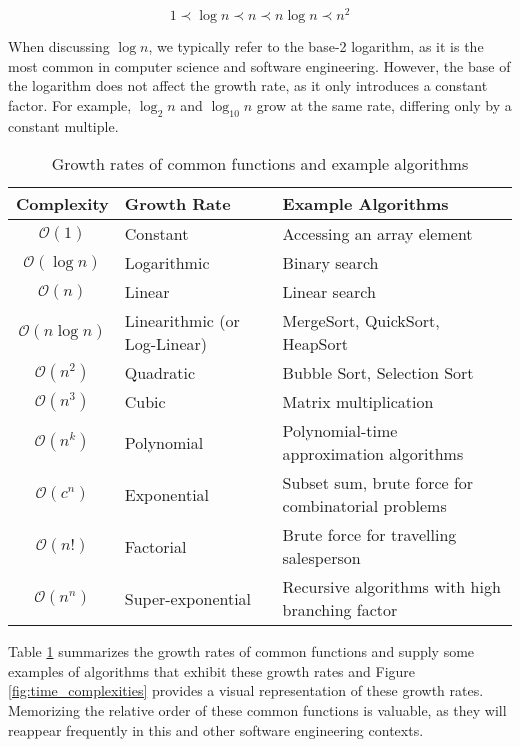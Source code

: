 \[
1 \prec \log n \prec n \prec n \log n \prec n^2
\]

\begin{remark}
    When discussing $\log n$, we typically refer to the base-2 logarithm, as it is the most common in computer science and software engineering. However, the base of the logarithm does not affect the growth rate, as it only introduces a constant factor. For example, $\log_2 n$ and $\log_{10} n$ grow at the same rate, differing only by a constant multiple.
\end{remark}

\begin{table}[htbp]
    \centering
    \renewcommand{\arraystretch}{1.4}
    \begin{tabular}{|c|l|l|}
        \hline
        \textbf{Complexity} & \textbf{Growth Rate} & \textbf{Example Algorithms} \\
        \hline
        \( \mathcal{O}(1) \) & Constant & Accessing an array element \\
        \hline
        \( \mathcal{O}(\log n) \) & Logarithmic & Binary search \\
        \hline
        \( \mathcal{O}(n) \) & Linear & Linear search \\
        \hline
        \( \mathcal{O}(n \log n) \) & Linearithmic (or Log-Linear) & MergeSort, QuickSort, HeapSort \\
        \hline
        \( \mathcal{O}(n^2) \) & Quadratic & Bubble Sort, Selection Sort \\
        \hline
        \( \mathcal{O}(n^3) \) & Cubic & Matrix multiplication \\
        \hline
        \( \mathcal{O}(n^k) \) & Polynomial & Polynomial-time approximation algorithms \\
        \hline
        \( \mathcal{O}(c^n) \) & Exponential & Subset sum, brute force for combinatorial problems \\
        \hline
        \( \mathcal{O}(n!) \) & Factorial & Brute force for travelling salesperson \\
        \hline
        \( \mathcal{O}(n^n) \) & Super-exponential & Recursive algorithms with high branching factor \\
        \hline
    \end{tabular}
    \caption{Growth rates of common functions and example algorithms}
    \label{tab:growth_rates}
\end{table}


Table \ref{tab:growth_rates} summarizes the growth rates of common functions and supply some examples of algorithms that exhibit these growth rates and Figure \ref{fig:time_complexities} provides a visual representation of these growth rates. Memorizing the relative order of these common functions is valuable, as they will reappear frequently in this and other software engineering contexts.

